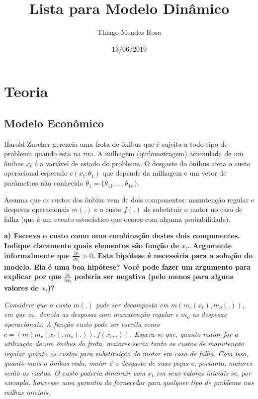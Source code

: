 \documentclass[]{article}
\title{Lista para Modelo Dinâmico}
\author{Thiago Mendes Rosa}
\date{13/06/2019}
\begin{document}
\maketitle

\hypertarget{teoria}{%
\section{Teoria}\label{teoria}}

\hypertarget{modelo-economico}{%
\subsection{Modelo Econômico}\label{modelo-economico}}

Harold Zurcher gerencia uma frota de ônibus que é sujeita a todo tipo de
problema quando esta na rua. A milhagem (quilometragem) acumulada de um
ônibus \(x_t\) é a variável de estado do problema. O desgaste do ônibus
afeta o custo operacional esperado \(c(x_t; \theta_1)\) que depende da
milhagem e um vetor de parâmetros não conhecido
\(\theta_1 = \{\theta_{11}, . . . , \theta_{1n}\}\).

Assuma que os custos dos ônbius vem de dois componentes: manutenção
regular e despesas operacionais \(m(.)\) e o custo \(f(.)\) de
substituir o motor no caso de falha (que é um evento estocástico que
ocorre com alguma probabilidade).

\textbf{a) Escreva o custo como uma combinação destes dois componentes.
Indique claramente quais elementos são função de \(x_t\). Argumente
informalmente que \(\frac{\partial c}{\partial x_t} > 0\). Esta hipótese
é necessária para a solução do modelo. Ela é uma boa hipótese? Você pode
fazer um argumento para explicar por que
\(\frac{\partial c}{\partial x_t}\) poderia ser negativa (pelo menos
para alguns valores de \(x_t\))?}

\emph{Considere que o custo \(m(.)\) pode ser decomposto em
\(m(m_r(x_t),m_o(.))\), em que \(m_r\) denota as desposas com manutenção
regular e \(m_o\) as despesas operacionais. A função custo pode ser
escrita como \(c=(m(m_r(x_t),m_o(.)),f(x_t,.))\). Espera-se que, quanto
maior for a utilização de um ônibus da frota, maiores serão tanto os
custos de manutenção regular quanto os custos para substituição do motor
em caso de falha. Com isso, quanto mais o ônibus roda, maior é o
desgaste de suas peças e, portanto, maiores serão os custos. O custo
poderia diminuir com \(x_t\) em seus valores iniciais se, por exemplo,
houvesse uma garantia do fornecedor para qualquer tipo de problema nas
milhas iniciais.}
\end{document}
